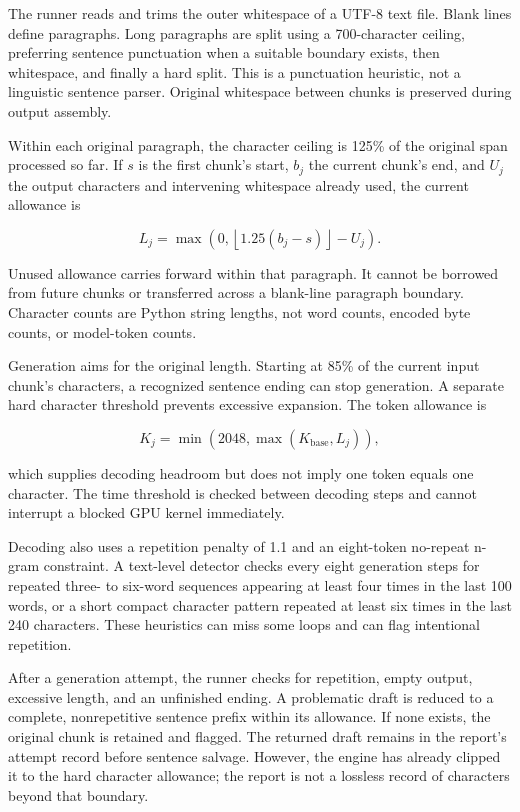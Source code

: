 \documentclass[manuscript,screen,nonacm]{acmart}
\begin{document}
The runner reads and trims the outer whitespace of a UTF-8 text file.
Blank lines define paragraphs. Long paragraphs are split using a
700-character ceiling, preferring sentence punctuation when a suitable
boundary exists, then whitespace, and finally a hard split. This is a
punctuation heuristic, not a linguistic sentence parser. Original
whitespace between chunks is preserved during output assembly.

Within each original paragraph, the character ceiling is 125\% of the
original span processed so far. If \(s\) is the first chunk's start,
\(b_j\) the current chunk's end, and \(U_j\) the output characters and
intervening whitespace already used, the current allowance is

\[
L_j=\max\left(0,\left\lfloor1.25(b_j-s)\right\rfloor-U_j\right).
\]

Unused allowance carries forward within that paragraph. It cannot be
borrowed from future chunks or transferred across a blank-line paragraph
boundary. Character counts are Python string lengths, not word counts,
encoded byte counts, or model-token counts.

Generation aims for the original length. Starting at 85\% of the current
input chunk's characters, a recognized sentence ending can stop
generation. A separate hard character threshold prevents excessive
expansion. The token allowance is

\[
K_j=\min\left(2048,\max(K_{\mathrm{base}},L_j)\right),
\]

which supplies decoding headroom but does not imply one token equals one
character. The time threshold is checked between decoding steps and
cannot interrupt a blocked GPU kernel immediately.

Decoding also uses a repetition penalty of 1.1 and an eight-token
no-repeat n-gram constraint. A text-level detector checks every eight
generation steps for repeated three- to six-word sequences appearing at
least four times in the last 100 words, or a short compact character
pattern repeated at least six times in the last 240 characters. These
heuristics can miss some loops and can flag intentional repetition.

After a generation attempt, the runner checks for repetition, empty
output, excessive length, and an unfinished ending. A problematic draft
is reduced to a complete, nonrepetitive sentence prefix within its
allowance. If none exists, the original chunk is retained and flagged.
The returned draft remains in the report's attempt record before
sentence salvage. However, the engine has already clipped it to the hard
character allowance; the report is not a lossless record of characters
beyond that boundary.
\end{document}
